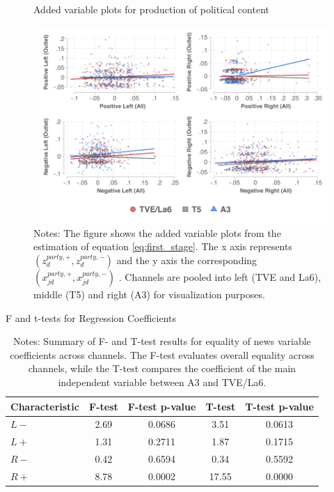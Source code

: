 \documentclass[12pt]{article}
\begin{document}
	
	
		\begin{figure}[h!]
		\centering
\caption{Added variable plots for production of political content}
		\includegraphics[width=160mm]{figures/fwl_plots}
		\caption*{\small Notes: The figure shows the added variable plots from the estimation of equation \ref{eq:first_stage}. The x axis represents $\left(z_d^{party,+},z_d^{party,-}\right) $ and the y axis the corresponding  $\left(x_{jd}^{party,+},x_{jd}^{party,-}\right) $   . Channels are pooled into left (TVE and La6), middle (T5) and right (A3) for visualization purposes.  }
		\label{fig:fwl}
	\end{figure}
	
	
	
	
	\begin{table}[h!]
		\centering
	
		\label{tab:tests}
		\caption{F and t-tests for Regression Coefficients}
		\begin{tabular}{lcccc}
			\hline
			Characteristic & F-test  & F-test p-value & T-test  & T-test p-value \\
			\hline
			$ {L-}$& 2.69 & 0.0686 & 3.51  & 0.0613 \\
			$ {L+}$ & 1.31 & 0.2711 & 1.87  & 0.1715 \\
			$ {R-}$ & 0.42 & 0.6594 & 0.34 & 0.5592 \\
$ {R+}$ & 8.78 & 0.0002 & 17.55  & 0.0000 \\
			\hline
		\end{tabular}
			\caption*{\small Notes: Summary of F- and T-test results for equality of news variable coefficients across channels. The F-test evaluates overall equality across channels, while the T-test compares the coefficient of the main independent variable between A3 and TVE/La6.}
	\end{table}
	
\end{document}

